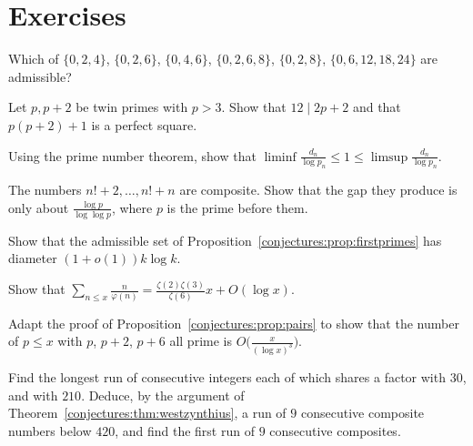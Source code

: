 \section{Exercises}

\begin{exercise}[$\star$]\label{conjectures:ex:admissible2}
Which of $\{0,2,4\}$, $\{0,2,6\}$, $\{0,4,6\}$, $\{0,2,6,8\}$, $\{0,2,8\}$, $\{0,6,12,18,24\}$ are admissible?
\end{exercise}

\begin{exercise}[$\star$]\label{conjectures:ex:twin12}
Let $p,p+2$ be twin primes with $p>3$. Show that $12\mid2p+2$ and that $p(p+2)+1$ is a perfect square.
\end{exercise}

\begin{exercise}[$\star$]\label{conjectures:ex:averagegap}
Using the prime number theorem, show that $\liminf\frac{d_n}{\log p_n}\le1\le\limsup\frac{d_n}{\log p_n}$.
\end{exercise}

\begin{exercise}[$\star$]\label{conjectures:ex:factorial}
The numbers $n!+2,\dots,n!+n$ are composite. Show that the gap they produce is only about $\frac{\log p}{\log\log p}$, where $p$ is the prime before them.
\end{exercise}

\begin{exercise}[$\star$]\label{conjectures:ex:diameter}
Show that the admissible set of Proposition~\ref{conjectures:prop:firstprimes} has diameter $(1+o(1))k\log k$.
\end{exercise}

\begin{exercise}[$\star\star$]\label{conjectures:ex:hphiavg}
Show that $\sum_{n\le x}\frac n{\varphi(n)}=\frac{\zeta(2)\zeta(3)}{\zeta(6)}x+O(\log x)$.
\end{exercise}

\begin{exercise}[$\star\star$]\label{conjectures:ex:triplesieve}
Adapt the proof of Proposition~\ref{conjectures:prop:pairs} to show that the number of $p\le x$ with $p$, $p+2$, $p+6$ all prime is $O\bigl(\frac x{(\log x)^3}\bigr)$.
\end{exercise}

\begin{exercise}[$\star\star$]\label{conjectures:ex:jacobsthal}
Find the longest run of consecutive integers each of which shares a factor with $30$, and with $210$. Deduce, by the argument of
Theorem~\ref{conjectures:thm:westzynthius}, a run of $9$ consecutive composite numbers below $420$, and find the first run of $9$ consecutive composites.
\end{exercise}

